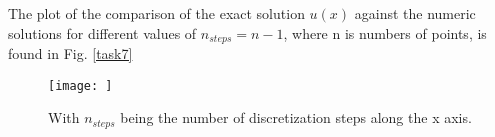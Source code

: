 The plot of the comparison of the exact solution $u(x)$ against the numeric solutions for different values of $n_{steps} = n - 1$, where n is numbers of points, is found in Fig. \ref{task7} 

\begin{figure}
    \centering
    \texttt{[image: ]}
    \caption{With $n_{steps}$ being the number of discretization steps along the x axis.}
    \label{fig:task7}
\end{figure}

